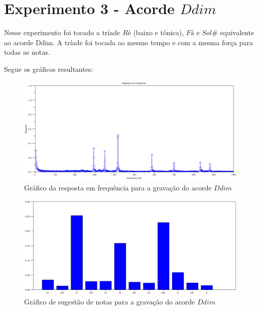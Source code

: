 \section{Experimento 3 - Acorde $Ddim$}
\label{sec:experimento3}

Nesse experimento foi tocado a tríade $Ré$ (baixo e tônica), $Fá$ e $Sol\#$ equivalente ao acorde Ddim. A tríade foi tocada ao mesmo tempo e com a mesma força para todas as notas.

Segue os gráficos resultantes:

\begin{figure}[h]
	\centering
		\includegraphics[keepaspectratio=true,scale=0.49]{figuras/Dm/fft_Ddim.eps}
	\caption{Gráfico da resposta em frequência para a gravação do acorde $Ddim$}
\end{figure}

\begin{figure}[h]
	\centering
		\includegraphics[keepaspectratio=true,scale=0.45]{figuras/Dm/notas_Ddim.eps}
	\caption{Gráfico de sugestão de notas para a gravação do acorde $Ddim$}
\end{figure}

